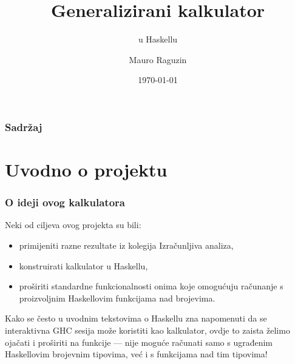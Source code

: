 \documentclass{beamer}
\title{Generalizirani kalkulator}
\subtitle{u Haskellu}
\author{Mauro Raguzin}
\institute{PMF-MO}
\date{\today}
\begin{document}
\frame{\titlepage}

\begin{frame}
    \frametitle{Sadržaj}
    \tableofcontents
\end{frame}

\section{Uvodno o projektu}

\begin{frame}
\frametitle{O ideji ovog kalkulatora}
Neki od ciljeva ovog projekta su bili:
\begin{itemize}
    \item primijeniti razne rezultate iz kolegija Izračunljiva analiza,
    \item konstruirati kalkulator u Haskellu,
    \item proširiti standardne funkcionalnosti onima koje omogućuju
    računanje s proizvoljnim Haskellovim funkcijama nad brojevima.
\end{itemize}
\pause
Kako se često u uvodnim tekstovima o Haskellu zna napomenuti da
se interaktivna GHC sesija može koristiti kao kalkulator, ovdje to
zaista želimo ojačati i proširiti na funkcije --- nije moguće računati
samo s ugrađenim Haskellovim brojevnim tipovima, već i s funkcijama
nad tim tipovima!
\end{frame}
\end{document}
